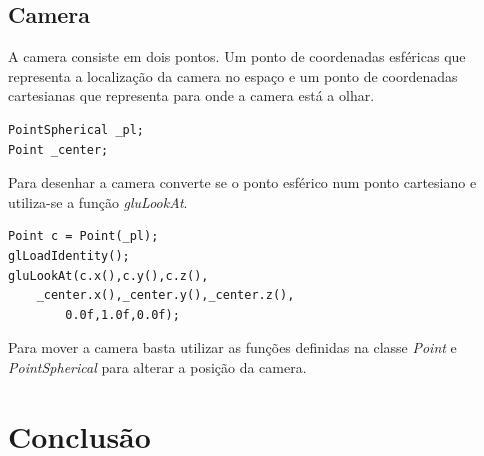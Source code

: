 \documentclass[a4paper]{report}
\begin{document}
\section{Camera}
A camera consiste em dois pontos. Um ponto de coordenadas esféricas que
representa a localização da camera no espaço e um ponto de coordenadas
cartesianas que representa para onde a camera está a olhar.\\
\begin{lstlisting}
PointSpherical _pl;
Point _center;
\end{lstlisting}
Para desenhar a camera converte se o ponto esférico num ponto cartesiano e
utiliza-se a função \textit{gluLookAt}.
\begin{lstlisting}
Point c = Point(_pl);
glLoadIdentity();
gluLookAt(c.x(),c.y(),c.z(), 
	_center.x(),_center.y(),_center.z(),
		0.0f,1.0f,0.0f);
\end{lstlisting}
Para mover a camera basta utilizar as funções definidas na classe \textit{Point}
e \textit{PointSpherical} para alterar a posição da camera.

\chapter{Conclusão}
\end{document}
